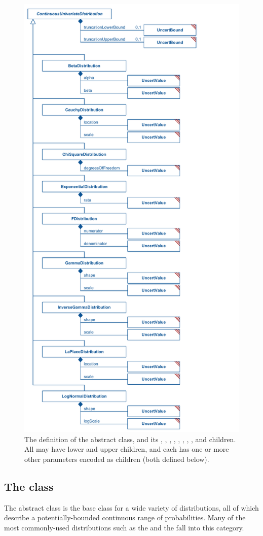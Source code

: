 \begin{figure}[htb]
\includegraphics[width=0.6\linewidth]{figs/continuousUnivariateDistribution_first.pdf}
\caption{The definition of the \ContinuousUnivariateDistribution abstract class, and its \BetaDistribution, \CauchyDistribution, \ChiSquareDistribution, \ExponentialDistribution, \FDistribution, \GammaDistribution, \InverseGammaDistribution, \LaplaceDistribution, and \LogNormalDistribution children.  All may have lower and upper \UncertBound children, and each has one or more other parameters encoded as \UncertValue children (both defined below).}
\label{fig:continuousUnivariateDistribution_first}
\end{figure}


\subsection{The  class}
\label{ContinuousUnivariateDistribution-class}
\label{continuousunivariatedistribution-class}
The abstract \ContinuousUnivariateDistribution class is the base class for a wide variety of distributions, all of which describe a potentially-bounded continuous range of probabilities.  Many of the most commonly-used distributions such as the \NormalDistribution and the \UniformDistribution fall into this category.

